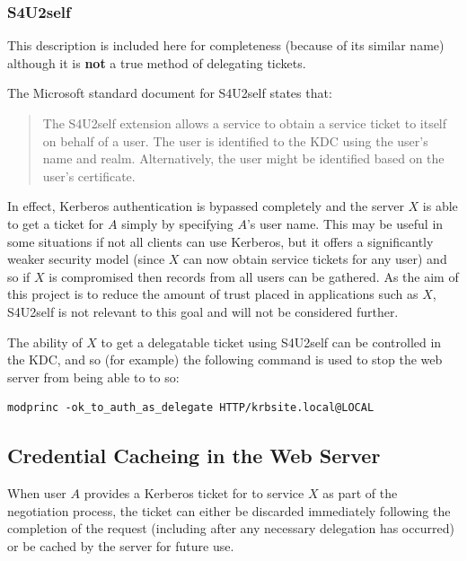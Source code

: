 \documentclass{article}
\begin{document}
\subsubsection{S4U2self}
This description is included here for completeness (because of its similar name) although it is \textbf{not} a true method of delegating tickets.

The Microsoft standard document for S4U2self\cite{MS-s4u2} states that:

\begin{quote}
  The S4U2self extension allows a service to obtain a service ticket to itself on behalf of a user. The user is identified to the KDC using the user's name and realm. Alternatively, the user might be identified based on the user's certificate.
\end{quote}

In effect, Kerberos authentication is bypassed completely and the server $X$ is able to get a ticket for $A$ simply by specifying $A$'s user name. This may be useful in some situations if not all clients can use Kerberos, but it offers a significantly weaker security model (since $X$ can now obtain service tickets for any user) and so if $X$ is compromised then records from all users can be gathered. As the aim of this project is to reduce the amount of trust placed in applications such as $X$, S4U2self is not relevant to this goal and will not be considered further.

The ability of $X$ to get a delegatable ticket using S4U2self can be controlled in the KDC, and so (for example) the following command is used to stop the web server from being able to to so:

\begin{verbatim}
modprinc -ok_to_auth_as_delegate HTTP/krbsite.local@LOCAL
\end{verbatim}

\subsection{Credential Cacheing in the Web Server}
When user $A$ provides a Kerberos ticket for to service $X$ as part of the negotiation process, the ticket can either be discarded immediately following the completion of the request (including after any necessary delegation has occurred) or be cached by the server for future use.
\end{document}
